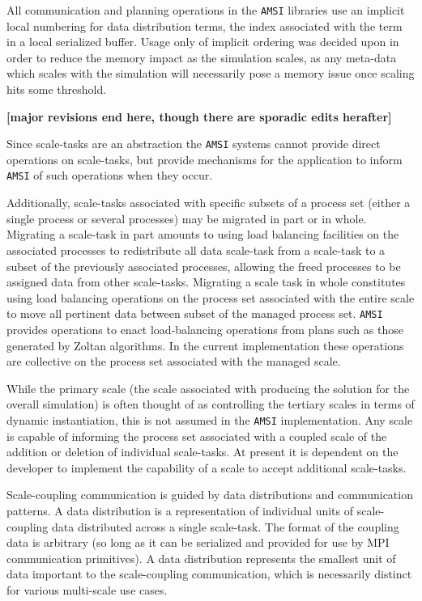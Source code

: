 \documentclass[11pt]{article}
\begin{document}
All communication and planning operations in the \verb|AMSI| libraries use an implicit local numbering for data distribution terms, the index associated with the term in a local serialized buffer.
Usage only of implicit ordering was decided upon in order to reduce the memory impact as the simulation scales, as any meta-data which scales with the simulation will necessarily pose a memory issue once scaling hits some threshold.

\textbf{[major revisions end here, though there are sporadic edits herafter]}

Since scale-tasks are an abstraction the \verb|AMSI| systems cannot provide direct operations on scale-tasks, but provide mechanisms for the application to inform \verb|AMSI| of such operations when they occur.

Additionally, scale-tasks associated with specific subsets of a process set (either a single process or several processes) may be migrated in part or in whole. Migrating a scale-task in part amounts to using load balancing facilities on the associated processes to redistribute all data scale-task from a scale-task to a subset of the previously associated processes, allowing the freed processes to be assigned data from other scale-tasks. Migrating a scale task in whole constitutes using load balancing operations on the process set associated with the entire scale to move all pertinent data between subset of the managed process set. \verb|AMSI| provides operations to enact load-balancing operations from plans such as those generated by Zoltan algorithms.  In the current implementation these operations are collective on the process set associated with the managed scale.

While the primary scale (the scale associated with producing the solution for the overall simulation) is often thought of as controlling the tertiary scales in terms of dynamic instantiation, this is not assumed in the \verb|AMSI| implementation. Any scale is capable of informing the process set associated with a coupled scale of the addition or deletion of individual scale-tasks. At present it is dependent on the developer to implement the capability of a scale to accept additional scale-tasks.

Scale-coupling communication is guided by data distributions and communication patterns. A data distribution is a representation of individual units of scale-coupling data distributed across a single scale-task. The format of the coupling data is arbitrary (so long as it can be serialized and provided for use by MPI communication primitives). A data distribution represents the smallest unit of data important to the scale-coupling communication, which is necessarily distinct for various multi-scale use cases.
\end{document}
